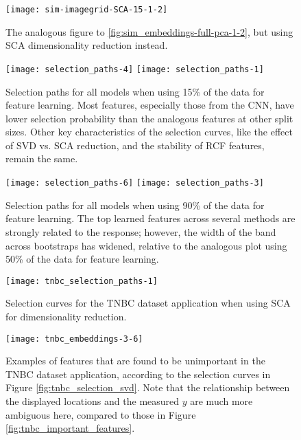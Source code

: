 \begin{figure}
  \centering
  \texttt{[image: sim-imagegrid-SCA-15-1-2]}
  \caption{The analogous figure to \ref{fig:sim_embeddings-full-pca-1-2}, but
    using SCA dimensionality reduction instead.}
  \label{fig:sim_imagegrid-SCA-15-1-2}
\end{figure}

\begin{figure}
  \centering
  \texttt{[image: selection\_paths-4]}
  \texttt{[image: selection\_paths-1]}
  \caption{Selection paths for all models when using 15\% of the data for
    feature learning. Most features, especially those from the CNN, have lower selection
    probability than the analogous features at other split sizes. Other key
    characteristics of the selection curves, like the effect of SVD vs. SCA
    reduction, and the stability of RCF features, remain the same.}
  \label{fig:selection_paths15}
\end{figure}

\begin{figure}
  \centering
  \texttt{[image: selection\_paths-6]}
  \texttt{[image: selection\_paths-3]}
  \caption{Selection paths for all models when using 90\% of the data for
    feature learning. The top learned features across several methods are
    strongly related to the response; however, the width of the band across
    bootstraps has widened, relative to the analogous plot using 50\% of the
    data for feature learning.}
  \label{fig:selection_paths90}
\end{figure}

\begin{figure}
  \centering
  \texttt{[image: tnbc\_selection\_paths-1]}
  \caption{Selection curves for the TNBC dataset application when using SCA for
    dimensionality reduction.}
  \label{fig:tnbc_selection_paths-1}
\end{figure}

\begin{figure}
  \centering
  \texttt{[image: tnbc\_embeddings-3-6]}
  \caption{Examples of features that are found to be unimportant in the TNBC
    dataset application, according to the selection curves in Figure
    \ref{fig:tnbc_selection_svd}. Note that the relationship between the
    displayed locations and the measured $y$ are much more ambiguous here,
    compared to those in Figure \ref{fig:tnbc_important_features}.}
  \label{fig:tnbc_embeddings-3-6}
\end{figure}

